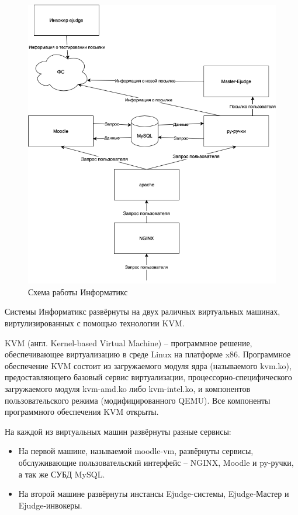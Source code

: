 \begin{figure}
  \centering
  \includegraphics[width=\textwidth]{figures/old_informatics.png}
  \caption{Схема работы Информатикс}
  \label{fig:old_informatics}
\end{figure}

Системы Информатикс развёрнуты на двух раличных виртуальных машинах,
виртулизированных с помощью технологии KVM.

KVM (англ. Kernel-based Virtual Machine) -- программное решение,
обеспечивающее виртуализацию в среде Linux на платформе x86.
Программное обеспечение KVM состоит из загружаемого модуля ядра (называемого kvm.ko),
предоставляющего базовый сервис виртуализации, процессорно-специфического загружаемого модуля kvm-amd.ko либо kvm-intel.ko, 
и компонентов пользовательского режима (модифицированного QEMU). 
Все компоненты программного обеспечения KVM открыты.

На каждой из виртуальных машин развёрнуты разные сервисы:

\begin{itemize}
    \item На первой машине, называемой moodle-vm, развёрнуты сервисы, обслуживающие пользовательский интерфейс -- NGINX, Moodle и py-ручки,
    а так же СУБД MySQL.
    \item На второй машине развёрнуты инстансы Ejudge-системы, Ejudge-Мастер и Ejudge-инвокеры.
\end{itemize}

